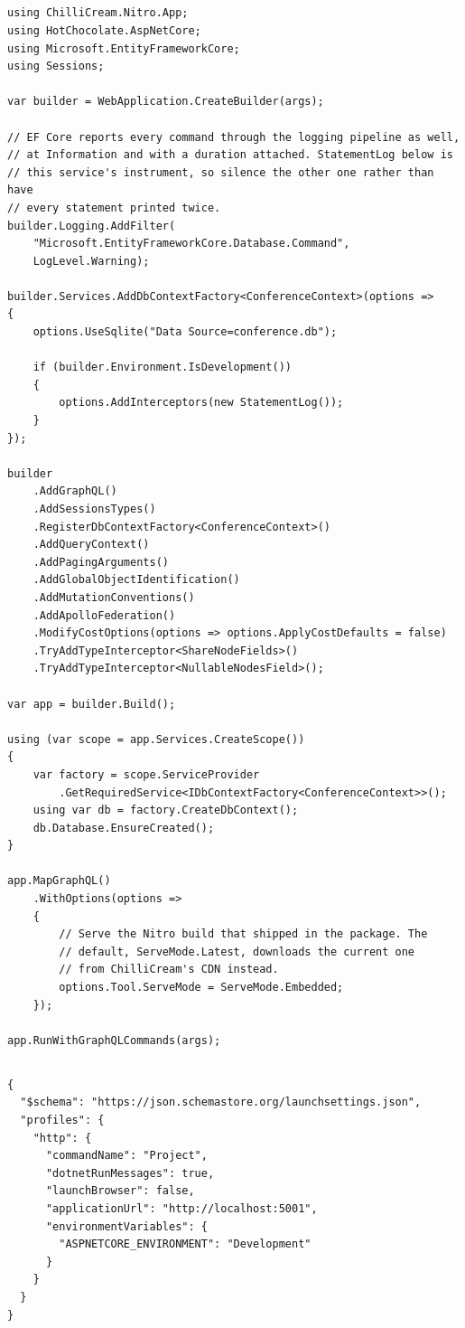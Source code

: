 \subsection*{}
\begin{verbatim}
using ChilliCream.Nitro.App;
using HotChocolate.AspNetCore;
using Microsoft.EntityFrameworkCore;
using Sessions;

var builder = WebApplication.CreateBuilder(args);

// EF Core reports every command through the logging pipeline as well,
// at Information and with a duration attached. StatementLog below is
// this service's instrument, so silence the other one rather than have
// every statement printed twice.
builder.Logging.AddFilter(
    "Microsoft.EntityFrameworkCore.Database.Command",
    LogLevel.Warning);

builder.Services.AddDbContextFactory<ConferenceContext>(options =>
{
    options.UseSqlite("Data Source=conference.db");

    if (builder.Environment.IsDevelopment())
    {
        options.AddInterceptors(new StatementLog());
    }
});

builder
    .AddGraphQL()
    .AddSessionsTypes()
    .RegisterDbContextFactory<ConferenceContext>()
    .AddQueryContext()
    .AddPagingArguments()
    .AddGlobalObjectIdentification()
    .AddMutationConventions()
    .AddApolloFederation()
    .ModifyCostOptions(options => options.ApplyCostDefaults = false)
    .TryAddTypeInterceptor<ShareNodeFields>()
    .TryAddTypeInterceptor<NullableNodesField>();

var app = builder.Build();

using (var scope = app.Services.CreateScope())
{
    var factory = scope.ServiceProvider
        .GetRequiredService<IDbContextFactory<ConferenceContext>>();
    using var db = factory.CreateDbContext();
    db.Database.EnsureCreated();
}

app.MapGraphQL()
    .WithOptions(options =>
    {
        // Serve the Nitro build that shipped in the package. The
        // default, ServeMode.Latest, downloads the current one
        // from ChilliCream's CDN instead.
        options.Tool.ServeMode = ServeMode.Embedded;
    });

app.RunWithGraphQLCommands(args);
\end{verbatim}

\subsection*{}
\begin{verbatim}
{
  "$schema": "https://json.schemastore.org/launchsettings.json",
  "profiles": {
    "http": {
      "commandName": "Project",
      "dotnetRunMessages": true,
      "launchBrowser": false,
      "applicationUrl": "http://localhost:5001",
      "environmentVariables": {
        "ASPNETCORE_ENVIRONMENT": "Development"
      }
    }
  }
}
\end{verbatim}

